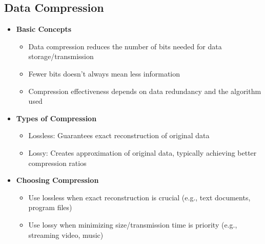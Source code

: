 \subsection*{Data Compression}
\begin{itemize}
    \item \textbf{Basic Concepts}
        \begin{itemize}
            \item Data compression reduces the number of bits needed for data storage/transmission %
            \item Fewer bits doesn't always mean less information %
            \item Compression effectiveness depends on data redundancy and the algorithm used %
        \end{itemize}

    \item \textbf{Types of Compression}
        \begin{itemize}
            \item Lossless: Guarantees exact reconstruction of original data %
            \item Lossy: Creates approximation of original data, typically achieving better compression ratios %
        \end{itemize}
    
    \item \textbf{Choosing Compression}
        \begin{itemize}
            \item Use lossless when exact reconstruction is crucial (e.g., text documents, program files) %
            \item Use lossy when minimizing size/transmission time is priority (e.g., streaming video, music) %
        \end{itemize}
\end{itemize}

